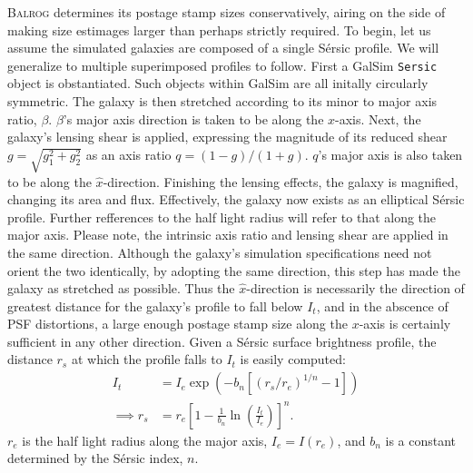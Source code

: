 \documentclass[12pt]{book}
\newcommand{\codett}[1]{\lstinline{#1}}
\newcommand{\galsim}{GalSim}
\newcommand{\balrog}{\textsc{Balrog}}
\newcommand{\sersic}{S\'{e}rsic}
\begin{document}
\balrog{} determines its postage stamp sizes conservatively,
airing on the side of making size estimages larger than perhaps strictly required.
To begin, let us assume the simulated galaxies are composed of a single \sersic{} profile.
We will generalize to multiple superimposed profiles to follow.
First a \galsim{} \codett{Sersic} object is obstantiated.
Such objects within \galsim{} are all initally circularly symmetric. 
The galaxy is then stretched according to its minor to major axis ratio, $\beta$.
$\beta$'s major axis direction is taken to be along the $x$-axis.
Next, the galaxy's lensing shear is applied, expressing the magnitude of its reduced shear 
\mbox{$g = \sqrt{ g_1^2 + g_2^2}$}
as an axis ratio
\mbox{$q = (1-g)/(1+g)$}.
$q$'s major axis is also taken to be along the $\hat{x}$-direction.
Finishing the lensing effects, the galaxy is magnified, changing its area and flux.
Effectively, the galaxy now exists as an elliptical \sersic{} profile.
Further refferences to the half light radius will refer to that along the major axis.
Please note, the intrinsic axis ratio and lensing shear are applied in the same direction. 
Although the galaxy's simulation specifications need not orient the two identically,
by adopting the same direction, this step has made the galaxy as stretched as possible.
Thus the $\hat{x}$-direction is necessarily the direction of greatest distance for the galaxy's profile to fall below $I_t$,
and in the abscence of PSF distortions, a large enough postage stamp size along the $x$-axis is certainly 
sufficient in any other direction. Given a \sersic{} surface brightness profile, the distance $r_s$ at which the profile
falls to $I_t$ is easily computed:
\begin{align}
I_t &= I_e \exp \left( -b_n \left[\left( r_s/r_e  \right)^{1/n} -1 \right] \right) \label{eq:sersic} \\
\implies r_s &= r_e \left[1 - \frac{1}{b_n}  \ln \left(\frac{I_t}{ I_e}\right) \right]^n. \label{eq:rt}
\end{align}
$r_e$ is the half light radius along the major axis, 
$I_e = I\left(r_e\right)$,
and $b_n$ is a constant determined by the \sersic{} index, $n$.
\end{document}
